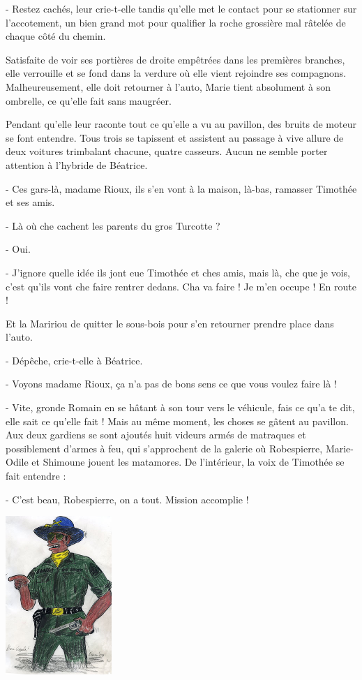 - Restez cachés, leur crie-t-elle tandis qu’elle met le contact pour se stationner sur l’accotement, un bien grand mot pour qualifier la roche grossière mal râtelée de chaque côté du chemin.

Satisfaite de voir ses portières de droite empêtrées dans les premières branches, elle verrouille et se fond dans la verdure où elle vient rejoindre ses compagnons. Malheureusement, elle doit retourner à l’auto, Marie tient absolument à son ombrelle, ce qu’elle fait sans maugréer.

Pendant qu’elle leur raconte tout ce qu’elle a vu au pavillon, des bruits de moteur se font entendre. Tous trois se tapissent et assistent au passage à vive allure de deux voitures trimbalant chacune, quatre casseurs. Aucun ne semble porter attention à l’hybride de Béatrice.

- Ces gars-là, madame Rioux, ils s’en vont à la maison, là-bas, ramasser Timothée et ses amis.

- Là où che cachent les parents du gros Turcotte ?

- Oui.

- J’ignore quelle idée ils jont eue Timothée et ches amis, mais là, che que je vois, c’est qu’ils vont che faire rentrer dedans. Cha va faire ! Je m’en occupe ! En route !

Et la Maririou de quitter le sous-bois pour s’en retourner prendre place dans l’auto.

- Dépêche, crie-t-elle à Béatrice.

- Voyons madame Rioux, ça n’a pas de bons sens ce que vous voulez faire là !

- Vite, gronde Romain en se hâtant à son tour vers le véhicule, fais ce qu’a te dit, elle sait ce qu’elle fait !
Mais au même moment, les choses se gâtent au pavillon. Aux deux gardiens se sont ajoutés huit videurs armés de matraques et possiblement d’armes à feu, qui s’approchent de la galerie où Robespierre, Marie-Odile et Shimoune jouent les matamores. De l’intérieur, la voix de Timothée se fait entendre :

- C’est beau, Robespierre, on a tout. Mission accomplie !

\begin{floatingfigure}[l]{45mm}
\includegraphics[height=60mm]{corps/chapitre18/img/personnage-robespierre-colonel.jpg}
\end{floatingfigure}

